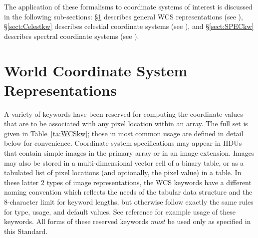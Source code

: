 \documentclass[11pt,makeidx]{book}     %
\begin{document}
The application of these formalisms to coordinate systems of interest is discussed
in the following sub-sections: \S\ref{sect:WCSkw} describes general WCS
representations (see \cite{greisen02}), \S\ref{sect:Celestkw} describes celestial coordinate
systems (see \cite{calabretta02}), and \S\ref{sect:SPECkw} describes spectral coordinate systems
(see \cite{greisen06}). 

\section{World Coordinate System Representations}\label{sect:WCSkw}

A variety of keywords have been reserved for computing the coordinate values that
are to be associated with any pixel location within an array. The full set is
given in Table~\ref{ta:WCSkw}; those in most common usage are defined in detail below for
convenience. Coordinate system specifications may appear in HDUs that contain
simple images in the primary array or in an image extension.  Images may also be 
stored in a  multi-dimensional vector cell of a binary table, or as a tabulated list of
pixel locations (and optionally, the pixel value) in a table.  In these latter 2 types
of image representations, the WCS keywords have a different naming convention 
which reflects the needs of the tabular data structure
and the 8-character limit for keyword lengths, but otherwise follow exactly the
same rules for type, usage, and default values. See reference \cite{calabretta02}
for example usage of these keywords.
All forms of these reserved keywords
{\em must} be used only as specified in this Standard. 
\end{document}
